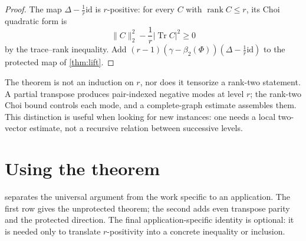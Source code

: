 \documentclass[11pt,reqno]{amsart}
\theoremstyle{remark}
\DeclareMathOperator{\Tr}{Tr}
\DeclareMathOperator{\rank}{rank}
\newcommand{\id}{\mathrm{id}}
\newcommand{\norm}[1]{\lVert #1\rVert}
\newcommand{\abs}[1]{\lvert #1\rvert}
\begin{document}
\begin{proof}
The map $\Delta-\frac1r\id$ is $r$-positive: for every
$C$ with $\rank C\le r$, its Choi quadratic form is
\[
  \norm C_2^2-\frac1r\abs{\Tr C}^2\ge0
\]
by the trace--rank inequality.  Add
$(r-1)(\gamma-\beta_2(\Phi))
(\Delta-\frac1r\id)$ to the protected map of \cref{thm:lift}.
\end{proof}

The theorem is not an induction on $r$, nor does it tensorize a rank-two
statement.  A partial transpose produces pair-indexed negative modes at level
$r$; the rank-two Choi bound controls each mode, and a complete-graph estimate
assembles them.  This distinction is useful when looking for new instances:
one needs a local two-vector estimate, not a recursive relation between
successive levels.

\section{Using the theorem}
\label{sec:using}

 separates the universal argument from the work specific
to an application.  The first row gives the unprotected theorem; the second
adds even transpose parity and the protected direction.  The final
application-specific identity is optional: it is needed only to translate
$r$-positivity into a concrete inequality or inclusion.
\end{document}
